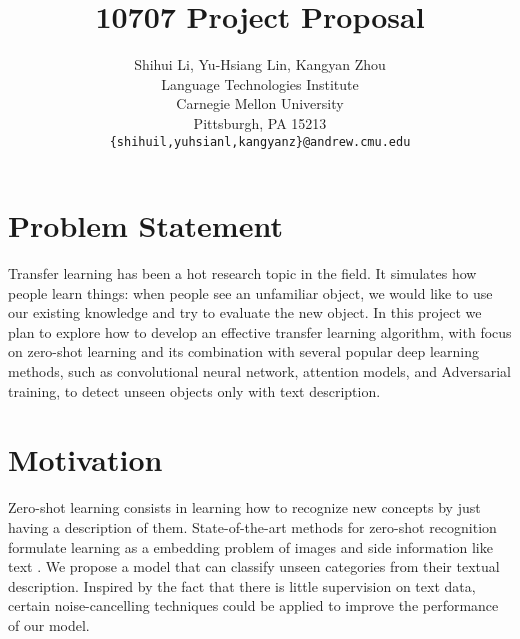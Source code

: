 \documentclass{article}
\title{\vspace{-4mm} 10707 Project Proposal \vspace{-4mm}}
\author{
	Shihui Li, Yu-Hsiang Lin, Kangyan Zhou
		\\
	Language Technologies Institute\\
	Carnegie Mellon University\\
	Pittsburgh, PA 15213 \\
	\texttt{\{shihuil,yuhsianl,kangyanz\}@andrew.cmu.edu} \\
}
\begin{document}

\maketitle




\vspace{-10mm}
\section{Problem Statement}
\vspace{-3mm}
Transfer learning has been a hot research topic in the field. It simulates how people learn things: when people see an unfamiliar object, we would like to use our existing knowledge and try to evaluate the new object. In this project we plan to explore how to develop an effective transfer learning algorithm, with focus on zero-shot learning and its combination with several popular deep learning methods, such as convolutional neural network, attention models, and Adversarial training, to detect unseen objects only with text description.



\vspace{-3mm}
\section{Motivation}
\vspace{-3mm}
Zero-shot learning consists in learning how to recognize new concepts by just having a description of them. State-of-the-art methods for zero-shot recognition formulate learning as a embedding problem of images and side information like text \cite{Elhoseiny2013}. We propose a model that can classify unseen categories from their textual description. Inspired by the fact that there is little supervision on text data, certain noise-cancelling techniques could be applied to improve the performance of our model.



\vspace{-3mm}
\end{document}
